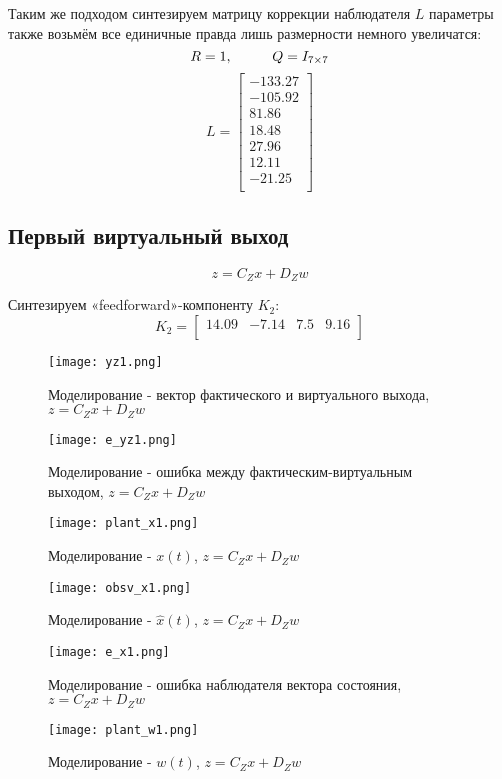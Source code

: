 Таким же подходом синтезируем матрицу коррекции наблюдателя $L$ параметры также возьмём все единичные правда лишь размерности немного увеличатся:
$$
  R = 1, \hspace*{1cm} Q = I_{7 \times 7}
$$
$$ 
L = \begin{bmatrix}
  -133.27 \\
  -105.92 \\
  81.86 \\
  18.48 \\
  27.96 \\
  12.11 \\
  -21.25 \\
\end{bmatrix}
$$

\newpage
\subsection{Первый виртуальный выход}
$$
  z = C_Z x + D_Z w
$$




Синтезируем «feedforward»-компоненту $K_2$:
$$
  K_2 = \begin{bmatrix}
    14.09 & -7.14 & 7.5 & 9.16 \\
\end{bmatrix}
$$


\begin{figure}[ht]
  \centering
  \texttt{[image: yz1.png]}
  \caption{Моделирование - вектор фактического и виртуального выхода, $z = C_Z x + D_Z w$}
\end{figure}
\newpage
\begin{figure}[ht]
  \centering
  \texttt{[image: e\_yz1.png]}
  \caption{Моделирование - ошибка между фактическим-виртуальным выходом, $z = C_Z x + D_Z w$}
\end{figure}


\begin{figure}[ht]
  \centering
  \texttt{[image: plant\_x1.png]}
  \caption{Моделирование - $x(t)$, $z = C_Z x + D_Z w$}
\end{figure}

\begin{figure}[ht]
  \centering
  \texttt{[image: obsv\_x1.png]}
  \caption{Моделирование - $\hat{x}(t)$, $z = C_Z x + D_Z w$}
\end{figure}


\begin{figure}[ht]
  \centering
  \texttt{[image: e\_x1.png]}
  \caption{Моделирование - ошибка наблюдателя вектора состояния, $z = C_Z x + D_Z w$}
\end{figure}
\newpage
\begin{figure}[ht]
  \centering
  \texttt{[image: plant\_w1.png]}
  \caption{Моделирование - $w(t)$, $z = C_Z x + D_Z w$}
\end{figure}


